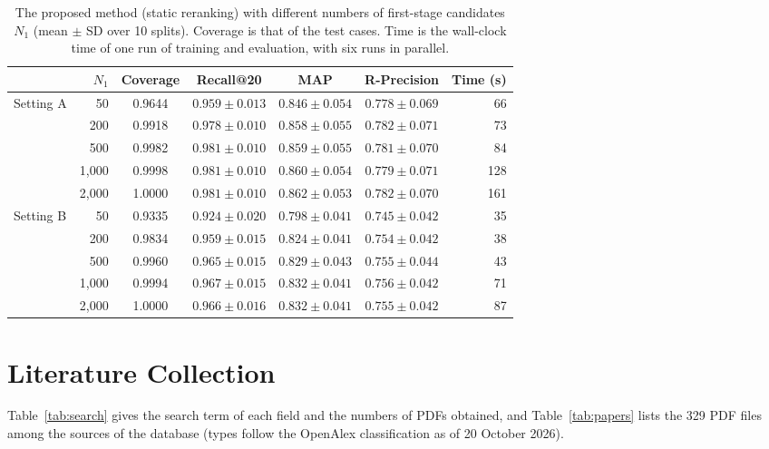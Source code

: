 \begin{table}[h]\centering
\caption{The proposed method (static reranking) with different numbers of first-stage candidates
$N_1$ (mean $\pm$ SD over 10 splits). Coverage is that of the test cases. Time is the wall-clock
time of one run of training and evaluation, with six runs in parallel.}
\label{tab:n1}
\footnotesize
\setlength{\tabcolsep}{3pt}
\begin{tabular}{@{}lrccccr@{}}
\toprule
 & $N_1$ & Coverage & Recall@20 & MAP & R-Precision & Time (s) \\
\midrule
Setting A & 50 & 0.9644 & $0.959 \pm 0.013$ & $0.846 \pm 0.054$ & $0.778 \pm 0.069$ & 66 \\
 & 200 & 0.9918 & $0.978 \pm 0.010$ & $0.858 \pm 0.055$ & $0.782 \pm 0.071$ & 73 \\
 & 500 & 0.9982 & $0.981 \pm 0.010$ & $0.859 \pm 0.055$ & $0.781 \pm 0.070$ & 84 \\
 & 1,000 & 0.9998 & $0.981 \pm 0.010$ & $0.860 \pm 0.054$ & $0.779 \pm 0.071$ & 128 \\
 & 2,000 & 1.0000 & $0.981 \pm 0.010$ & $0.862 \pm 0.053$ & $0.782 \pm 0.070$ & 161 \\
\midrule
Setting B & 50 & 0.9335 & $0.924 \pm 0.020$ & $0.798 \pm 0.041$ & $0.745 \pm 0.042$ & 35 \\
 & 200 & 0.9834 & $0.959 \pm 0.015$ & $0.824 \pm 0.041$ & $0.754 \pm 0.042$ & 38 \\
 & 500 & 0.9960 & $0.965 \pm 0.015$ & $0.829 \pm 0.043$ & $0.755 \pm 0.044$ & 43 \\
 & 1,000 & 0.9994 & $0.967 \pm 0.015$ & $0.832 \pm 0.041$ & $0.756 \pm 0.042$ & 71 \\
 & 2,000 & 1.0000 & $0.966 \pm 0.016$ & $0.832 \pm 0.041$ & $0.755 \pm 0.042$ & 87 \\
\bottomrule
\end{tabular}
\end{table}

\clearpage
\section{Literature Collection}
\label{app:papers}
Table~\ref{tab:search} gives the search term of each field and the numbers of PDFs obtained, and
Table~\ref{tab:papers} lists the 329 PDF files among the sources of the database (types follow the
OpenAlex classification as of 20 October 2026).





